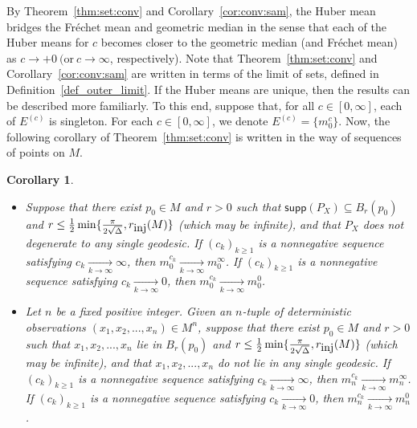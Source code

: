 \documentclass[preprint]{imsart}
\theoremstyle{plain}
\newtheorem{corollary}{Corollary}
\theoremstyle{remark}
\begin{document}
\begin{appendix}
By Theorem~\ref{thm:set:conv} and Corollary~\ref{cor:conv:sam}, the Huber mean bridges the Fr\'{e}chet mean and geometric median in the sense that each of the Huber means for $c$ becomes closer to the geometric median (and Fr\'{e}chet mean) as $c\rightarrow +0 ~ (\mbox{or}~ c \rightarrow \infty$, respectively). Note that Theorem~\ref{thm:set:conv} and Corollary~\ref{cor:conv:sam} are written in terms of the limit of sets, defined in Definition~\ref{def_outer_limit}. If the Huber means are unique, then the results can be described more familiarly. To this end, suppose that, for all $c\in [0, \infty]$, each of $E^{(c)}$ is singleton. For each $c \in [0, \infty]$, we denote $E^{(c)}=\{m^{c}_{0} \}$. Now, the following corollary of Theorem~\ref{thm:set:conv} is written in the way of sequences of points on $M$. 
\begin{corollary}\label{cor:meaning:huber}
\begin{itemize}
\item[(a)] Suppose that there exist $p_0 \in M$ and $r > 0$ such that $\textsf{supp}(P_{X}) \subseteq B_{r}(p_0)$ and $r \le \frac{1}{2}\min\{\frac{\pi}{2\sqrt{\Delta}},r_{\mbox{\tiny inj}}(M)\}$ (which may be infinite), and that $P_{X}$ does not degenerate to any single geodesic. If $(c_{k})_{k \ge 1}$ is a nonnegative sequence satisfying $c_{k} \underset{k \rightarrow \infty}{\rightarrow} \infty$, then $m^{c_k}_{0} \underset{k \rightarrow \infty}{\rightarrow} m^{\infty}_0$. If $(c_{k})_{k \ge 1}$ is a nonnegative sequence satisfying $c_{k} \underset{k \rightarrow \infty}{\rightarrow} 0$, then $m^{c_{k}}_{0} \underset{k \rightarrow \infty}{\rightarrow} m^{0}_0$.
\item[(b)] Let $n$ be a fixed positive integer. Given an $n$-tuple of deterministic observations $(x_{1}, x_{2}, ..., x_{n}) \in M^{n}$, suppose that there exist $p_0 \in M$ and $r > 0$ such that $x_{1}, x_{2}, ..., x_{n}$ lie in $B_{r}(p_0)$ and $r \le \frac{1}{2}\min\{\frac{\pi}{2\sqrt{\Delta}}, r_{\mbox{\tiny inj}}(M)\}$ (which may be infinite), and that $x_{1}, x_{2}, ..., x_{n}$ do not lie in any single geodesic. If $(c_{k})_{k \ge 1}$ is a nonnegative sequence satisfying $c_{k} \underset{k \rightarrow \infty}{\rightarrow} \infty$, then $m^{c_k}_{n} \underset{k \rightarrow \infty}{\rightarrow} m^{\infty}_n$. If $(c_{k})_{k \ge 1}$ is a nonnegative sequence satisfying $c_{k} \underset{k \rightarrow \infty}{\rightarrow} 0$, then $m^{c_k}_{n} \underset{k \rightarrow \infty}{\rightarrow} m^{0}_n$.
\end{itemize}
\end{corollary}

\end{appendix}
\end{document}
